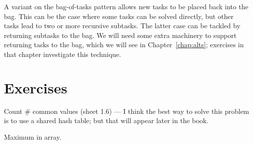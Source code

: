 A variant on the bag-of-tasks pattern allows new tasks to be placed back into
the bag.  This can be the case where some tasks can be solved directly, but
other tasks lead to two or more recursive subtasks.  The latter case can be
tackled by returning subtasks to the bag.  We will need some extra machinery
to support returning tasks to the bag, which we will see in
Chapter~\ref{chap:alts}; exercises in that chapter investigate this technique.





\section*{Exercises}




 Count \# common values (sheet 1.6) --- I think the best way to
solve this problem is to use a shared hash table; but that will appear later
in the book. 

 Maximum in array.




